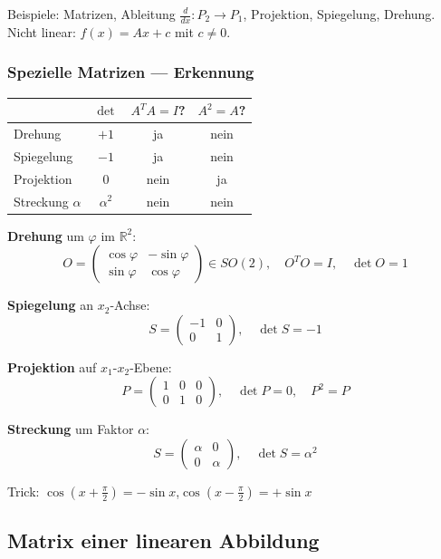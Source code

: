 \documentclass[10pt,a4paper,twocolumn]{article}
\newcommand{\detail}[1]{{\small\color{detail}#1}}
\begin{document}
	\detail{Beispiele: Matrizen, Ableitung $\frac{d}{dx}:P_2\to P_1$, Projektion, Spiegelung, Drehung.\\
		Nicht linear: $f(x)=Ax+c$ mit $c\neq0$.}
	
	\subsubsection{Spezielle Matrizen — Erkennung}
	
	\begin{tcolorbox}[defbox, title={Übersicht}]
		\begin{tabular}{@{}lccc@{}}
			\toprule
			& $\det$ & $A^TA{=}I$? & $A^2{=}A$? \\
			\midrule
			Drehung & $+1$ & ja & nein \\
			Spiegelung & $-1$ & ja & nein \\
			Projektion & $0$ & nein & ja \\
			Streckung $\alpha$ & $\alpha^2$ & nein & nein \\
			\bottomrule
		\end{tabular}
	\end{tcolorbox}
	
	\textbf{Drehung} um $\varphi$ im $\mathbb{R}^2$:
	$$O=\begin{pmatrix}\cos\varphi&-\sin\varphi\\\sin\varphi&\cos\varphi\end{pmatrix}\in SO(2),\quad O^TO=I,\quad\det O=1$$
	
	\textbf{Spiegelung} an $x_2$-Achse:
	$$S=\begin{pmatrix}-1&0\\0&1\end{pmatrix},\quad\det S=-1$$
	
	\textbf{Projektion} auf $x_1$-$x_2$-Ebene:
	$$P=\begin{pmatrix}1&0&0\\0&1&0\end{pmatrix},\quad\det P=0,\quad P^2=P$$
	
	\textbf{Streckung} um Faktor $\alpha$:
	$$S=\begin{pmatrix}\alpha&0\\0&\alpha\end{pmatrix},\quad\det S=\alpha^2$$
	
	\detail{Trick: $\cos(x+\tfrac{\pi}{2})=-\sin x$,\quad $\cos(x-\tfrac{\pi}{2})=+\sin x$}
	
	\subsection{Matrix einer linearen Abbildung}
	
\end{document}
